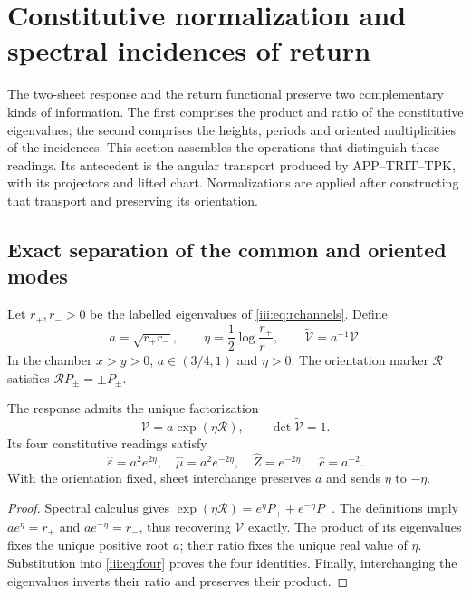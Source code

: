 \section{Constitutive normalization and spectral incidences of return}
\label{iii:sec:incidencias-espectrales}

The two-sheet response and the return functional preserve two
complementary kinds of information. The first comprises the product
and ratio of the constitutive eigenvalues; the second comprises the
heights, periods and oriented multiplicities of the incidences.
This section assembles the operations that distinguish these readings.
Its antecedent is the angular transport produced by APP--TRIT--TPK,
with its projectors and lifted chart. Normalizations are applied after
constructing that transport and preserving its orientation.

\subsection{Exact separation of the common and oriented modes}

Let $r_+,r_->0$ be the labelled eigenvalues of
\eqref{iii:eq:rchannels}. Define
\begin{equation}
 a=\sqrt{r_+r_-},\qquad
 \eta=\frac12\log\frac{r_+}{r_-},\qquad
 \widetilde{\mathcal V}=a^{-1}\mathcal V.
 \label{iii:eq:rec27-normalizacion}
\end{equation}
In the chamber $x>y>0$, $a\in(3/4,1)$ and $\eta>0$.
The orientation marker $\mathcal R$ satisfies
$\mathcal R P_\pm=\pm P_\pm$.

\begin{proposition}
\label{iii:prop:rec27-factorizacion}
The response admits the unique factorization
\begin{equation}
 \mathcal V=a\exp(\eta\mathcal R),\qquad
 \det\widetilde{\mathcal V}=1.
 \label{iii:eq:rec27-unimodular}
\end{equation}
Its four constitutive readings satisfy
\begin{equation}
 \widehat\varepsilon=a^2e^{2\eta},\quad
 \widehat\mu=a^2e^{-2\eta},\quad
 \widehat Z=e^{-2\eta},\quad
 \widehat c=a^{-2}.
 \label{iii:eq:rec27-cuatro}
\end{equation}
With the orientation fixed, sheet interchange preserves $a$ and sends
$\eta$ to $-\eta$.
\end{proposition}
\begin{proof}
Spectral calculus gives
$\exp(\eta\mathcal R)=e^\eta P_++e^{-\eta}P_-$.
The definitions imply $ae^\eta=r_+$ and $ae^{-\eta}=r_-$,
thus recovering $\mathcal V$ exactly.
The product of its eigenvalues fixes the unique positive root $a$;
their ratio fixes the unique real value of $\eta$.
Substitution into \eqref{iii:eq:four} proves the four identities.
Finally, interchanging the eigenvalues inverts their ratio and preserves
their product.
\end{proof}

